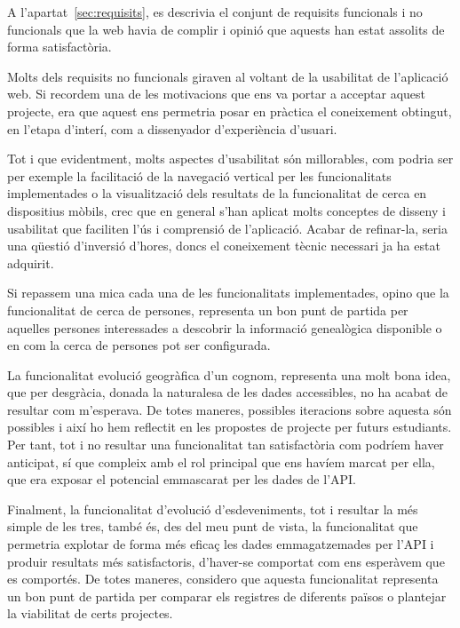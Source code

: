     A l'apartat~\ref{sec:requisits}, es descrivia el conjunt de requisits funcionals i no funcionals que la web havia de complir i opinió que aquests han estat assolits de forma satisfactòria.

    Molts dels requisits no funcionals giraven al voltant de la usabilitat de l'aplicació web. Si recordem una de les motivacions que ens va portar a acceptar aquest projecte, era que aquest ens permetria posar en pràctica el coneixement obtingut, en l'etapa d'interí, com a dissenyador d'experiència d'usuari.

    Tot i que evidentment, molts aspectes d'usabilitat són millorables, com podria ser per exemple la facilitació de la navegació vertical per les funcionalitats implementades o la visualització dels resultats de la funcionalitat de cerca en dispositius mòbils, crec que en general s'han aplicat molts conceptes de disseny i usabilitat que faciliten l'ús i comprensió de l'aplicació. Acabar de refinar-la, seria una qüestió d'inversió d'hores, doncs el coneixement tècnic necessari ja ha estat adquirit.

    Si repassem una mica cada una de les funcionalitats implementades, opino que la funcionalitat de cerca de persones, representa un bon punt de partida per aquelles persones interessades a descobrir la informació genealògica disponible o en com la cerca de persones pot ser configurada.

    La funcionalitat evolució geogràfica d'un cognom, representa una molt bona idea, que per desgràcia, donada la naturalesa de les dades accessibles, no ha acabat de resultar com m'esperava. De totes maneres, possibles iteracions sobre aquesta són possibles i així ho hem reflectit en les propostes de projecte per futurs estudiants. Per tant, tot i no resultar una funcionalitat tan satisfactòria com podríem haver anticipat, sí que compleix amb el rol principal que ens havíem marcat per ella, que era exposar el potencial emmascarat per les dades de l'API.

    Finalment, la funcionalitat d'evolució d'esdeveniments, tot i resultar la més simple de les tres, també és, des del meu punt de vista, la funcionalitat que permetria explotar de forma més eficaç les dades emmagatzemades per l'API i produir resultats més satisfactoris, d'haver-se comportat com ens esperàvem que es comportés. De totes maneres, considero que aquesta funcionalitat representa un bon punt de partida per comparar els registres de diferents països o plantejar la viabilitat de certs projectes.

